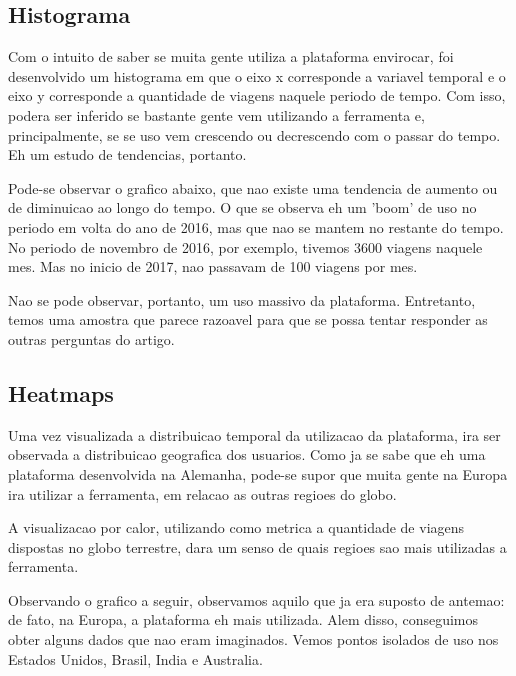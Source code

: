 \documentclass[10pt, conference]{IEEEtran}
\begin{document}
\subsection{Histograma}

Com o intuito de saber se muita gente utiliza a plataforma envirocar, foi desenvolvido
um histograma em que o eixo x corresponde a variavel temporal e o eixo y corresponde
a quantidade de viagens naquele periodo de tempo. Com isso, podera ser inferido se bastante
gente vem utilizando a ferramenta e, principalmente, se se uso vem crescendo ou decrescendo
com o passar do tempo. Eh um estudo de tendencias, portanto.

Pode-se observar o grafico abaixo, que nao existe uma tendencia de aumento ou de diminuicao
ao longo do tempo. O que se observa eh um 'boom' de uso no periodo em volta do ano de 2016,
mas que nao se mantem no restante do tempo. No periodo de novembro de 2016, por exemplo, 
tivemos 3600 viagens naquele mes. Mas no inicio de 2017, nao passavam de 100 viagens por mes.

Nao se pode observar, portanto, um uso massivo da plataforma. Entretanto, temos uma amostra
que parece razoavel para que se possa tentar responder as outras perguntas do artigo.



\subsection{Heatmaps}

Uma vez visualizada a distribuicao temporal da utilizacao da plataforma, ira ser observada a
distribuicao geografica dos usuarios. Como ja se sabe que eh uma plataforma desenvolvida
na Alemanha, pode-se supor que muita gente na Europa ira utilizar a ferramenta, em relacao
as outras regioes do globo.

A visualizacao por calor, utilizando como metrica a quantidade de viagens dispostas no globo
terrestre, dara um senso de quais regioes sao mais utilizadas a ferramenta.

Observando o grafico a seguir, observamos aquilo que ja era suposto de antemao: de fato,
na Europa, a plataforma eh mais utilizada. Alem disso, conseguimos obter alguns dados que nao
eram imaginados. Vemos pontos isolados de uso nos Estados Unidos, Brasil, India e Australia.
\end{document}

